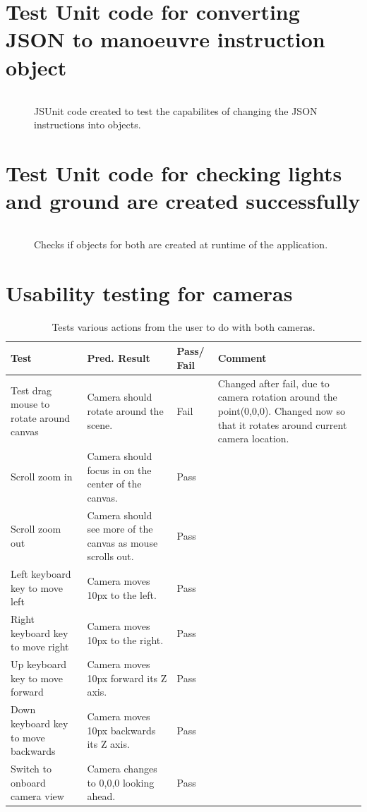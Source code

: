 \section{Test Unit code for converting JSON to manoeuvre instruction object}
\label{test:jsonmvoes}
\begin{figure}[h!]
\caption{JSUnit code created to test the capabilites of changing the JSON instructions into objects.}
\begin{lstlisting}
\end{lstlisting}
\end{figure}

\section{Test Unit code for checking lights and ground are created successfully}
\label{test:lights}
\begin{figure}[h!]
\caption{Checks if objects for both are created at runtime of the application.}
\begin{lstlisting}
\end{lstlisting}
\end{figure}

\section{Usability testing for cameras}
\label{test:cameras}
\begin{table}[h]
\begin{tabular}{|p{4.5cm}|p{4.5cm}|p{1cm}|p{4cm}|}
\hline
\textbf{Test} & \textbf{Pred. Result} & \textbf{Pass/ Fail} & \textbf{Comment}                        \\ \hline
Test drag mouse to rotate around canvas    &  Camera should rotate around the scene.  &     Fail       &  Changed after fail, due to camera rotation around the point(0,0,0). Changed now so that it rotates around current camera location.    \\ \hline
Scroll zoom in    &   Camera should focus in on the center of the canvas. &   Pass         &    \\ \hline
Scroll zoom out    &   Camera should see more of the canvas as mouse scrolls out. & Pass           &     \\ \hline
Left keyboard key to move left    &  Camera moves 10px to the left.  &   Pass         &     \\ \hline
Right keyboard key to move right    & Camera moves 10px to the right.   &    Pass        &     \\ \hline
Up keyboard key to move forward    &  Camera moves 10px forward its Z axis.  &   Pass         &     \\ \hline
Down keyboard key to move backwards    &  Camera moves 10px backwards its Z axis.  &  Pass          &     \\ \hline
Switch to onboard camera view   &  Camera changes to 0,0,0 looking ahead. &  Pass          &     \\ \hline
\end{tabular}
\caption{Tests various actions from the user to do with both cameras.}
\end{table}

